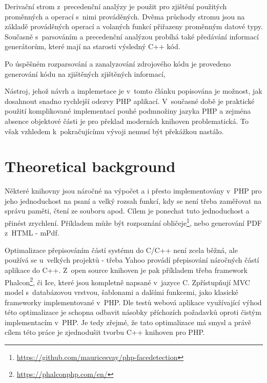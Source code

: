 \documentclass[czech]{ExcelAtFIT}
\begin{document}

		Derivační strom z~precedenční analýzy je použit pro zjištění použitých proměnných a operací s~nimi prováděných. Dvěma průchody stromu jsou na základě prováděných operací a volaných funkcí přiřazeny proměnným datové typy. Současně s~parsováním a precedenční analýzou probíhá také předávání informací generátorům, které mají na starosti výsledný C++ kód.

		Po úspěšném rozparsování a zanalyzování zdrojového kódu je provedeno generování kódu na zjištěných zjištěných informací,


		Nástroj, jehož návrh a implemetace je v~tomto článku popisována je možnost, jak dosahnout snadno rychlejší odezvy PHP aplikací. V~současné době je praktické použití komplikované implementací pouhé podmnožiny jazyka PHP a zejména absence objektové části je pro překlad moderních knihoven problematická. To však vzhledem k~pokračujícímu vývoji nemusí být překážkou nastálo.






\section{Theoretical background}

	Některé knihovny jsou náročné na výpočet a i přesto implementovány v~PHP pro jeho jednoduchost na psaní a velký rozsah funkcí, kdy se není třeba zaměřovat na správu paměti, čtení ze souboru apod. Cílem je ponechat tuto jednoduchost a přinést zrychlení. Příkladem může být rozpoznání obličeje\footnote{\url{https://github.com/mauricesvay/php-facedetection}}, nebo generování PDF z~HTML - mPdf.

	Optimalizace přepisováním částí systému do C/C++ není zcela běžná, ale používá se u~velkých projektů - třeba Yahoo provádí přepisování náročných částí aplikace do C++\cite{yahooCpp}. Z~open source knihoven je pak příkladem třeba framework Phalcon\footnote{\url{https://phalconphp.com/en/}}, či Ice, které jsou kompletně napsané v~jazyce C. Zpřístupňují MVC model s~databázovou vrstvou, šablonami a dalšími funkcemi, jako klasické frameworky implementované v~PHP. Dle testů\cite{phalconBenchmark} webová aplikace využívající výhod této optimalizace je schopna odbavit násobky příchozích požadavků oproti čistým implementacím v~PHP. Je tedy zřejmé, že tato optimalizace má smysl a právě cílem této práce je zjednodušit tvorbu C++ knihoven pro PHP.
\end{document}
